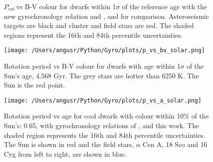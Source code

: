 \documentclass[10pt,preprint]{aastex}
\newcommand{\prot}{$P_{rot}~$}
\begin{document}
\begin{figure}[ht]
\begin{center}
    \end{center}
    \caption{ \prot vs B-V colour for dwarfs within 1$\sigma$ of the reference age with the new gyrochronology relation and \citet{Barnes2007}, and \citet{Mamajek2008} for comparison. Asteroseismic targets are black and cluster and field stars are red. The shaded regions represent the 16th and 84th percentile uncertainties.
     }
   \label{fig:subfigures2}
\end{figure}

\begin{figure}[ht]
\begin{center}
\texttt{[image: /Users/angusr/Python/Gyro/plots/p\_vs\_bv\_solar.png]}
\caption{Rotation period vs B-V colour for dwarfs with age within 1$\sigma$ of the Sun's age, 4.568 Gyr. The grey stars are hotter than 6250 K. The Sun is the red point.}
\label{fig:p_vs_bv_solar}
\end{center}
\end{figure}

\begin{figure}[ht]
\begin{center}
\texttt{[image: /Users/angusr/Python/Gyro/plots/p\_vs\_a\_solar.png]}
\caption{Rotation period vs age for cool dwarfs with colour within 10\% of the Sun's: 0.65, with gyrochronology relations of \citet{Barnes2007}, \citet{Mamajek2008} and this work. The shaded region represents the 16th and 84th percentile uncertainties. The Sun is shown in red and the field stars, $\alpha$ Cen A, 18 Sco and 16 Cyg from left to right, are shown in blue.}
\label{fig:p_vs_a_solar}
\end{center}
\end{figure}
\end{document}
